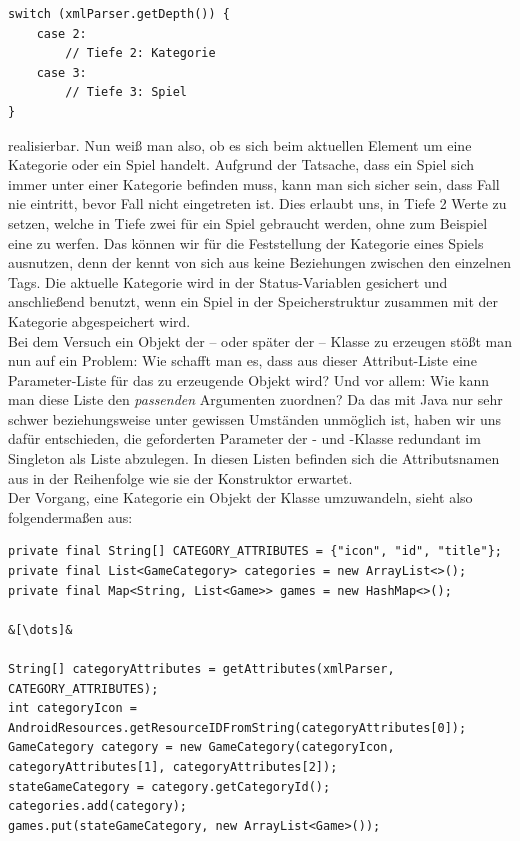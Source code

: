 \begin{lstlisting} 
switch (xmlParser.getDepth()) {
    case 2:
        // Tiefe 2: Kategorie
    case 3:
        // Tiefe 3: Spiel
}
\end{lstlisting}

realisierbar. Nun weiß man also, ob es sich beim aktuellen Element um eine
Kategorie oder ein Spiel handelt. Aufgrund der Tatsache, dass ein Spiel sich
immer unter einer Kategorie befinden muss, kann man sich sicher sein, dass Fall
 nie eintritt, bevor Fall  nicht eingetreten ist. Dies erlaubt
uns, in Tiefe 2 Werte zu setzen, welche in Tiefe zwei für ein Spiel gebraucht
werden, ohne zum Beispiel eine  zu werfen. Das können
wir für die Feststellung der Kategorie eines Spiels ausnutzen, denn der
 kennt von sich aus keine Beziehungen zwischen den
einzelnen Tags. Die aktuelle Kategorie wird in der Status-Variablen
 gesichert und anschließend benutzt, wenn ein Spiel in
der Speicherstruktur zusammen mit der Kategorie abgespeichert wird.\\ Bei dem
Versuch ein Objekt der  -- oder später der  --
Klasse zu erzeugen stößt man nun auf ein Problem: Wie schafft man es, dass aus
dieser Attribut-Liste eine Parameter-Liste für das zu erzeugende Objekt wird?
Und vor allem: Wie kann man diese Liste den \emph{passenden} Argumenten
zuordnen? Da das mit Java nur sehr schwer beziehungsweise unter gewissen
Umständen unmöglich ist, haben wir uns dafür entschieden, die geforderten
Parameter der - und -Klasse redundant im Singleton
als Liste abzulegen. In diesen Listen befinden sich die Attributsnamen aus
 in der Reihenfolge wie sie der Konstruktor erwartet.\\ Der
Vorgang, eine Kategorie ein Objekt der Klasse  umzuwandeln,
sieht also folgendermaßen aus:

\begin{lstlisting}
private final String[] CATEGORY_ATTRIBUTES = {"icon", "id", "title"};
private final List<GameCategory> categories = new ArrayList<>();
private final Map<String, List<Game>> games = new HashMap<>();

&[\dots]&

String[] categoryAttributes = getAttributes(xmlParser, CATEGORY_ATTRIBUTES);
int categoryIcon = AndroidResources.getResourceIDFromString(categoryAttributes[0]);
GameCategory category = new GameCategory(categoryIcon, categoryAttributes[1], categoryAttributes[2]);
stateGameCategory = category.getCategoryId();
categories.add(category);
games.put(stateGameCategory, new ArrayList<Game>());
\end{lstlisting}

